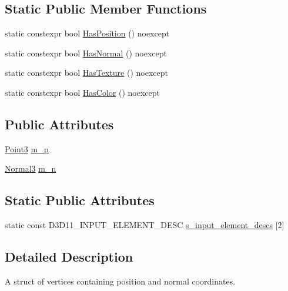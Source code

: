 \subsection*{Static Public Member Functions}
\begin{DoxyCompactItemize}
\item 
static constexpr bool \hyperlink{structmage_1_1rendering_1_1_vertex_position_normal_a90efd74233b76b071a322d737caf3abf}{Has\+Position} () noexcept
\item 
static constexpr bool \hyperlink{structmage_1_1rendering_1_1_vertex_position_normal_af5a32a3e51ce13c36b665f83f40209b6}{Has\+Normal} () noexcept
\item 
static constexpr bool \hyperlink{structmage_1_1rendering_1_1_vertex_position_normal_a40b091a64d0b5b2c2a07b382cd546589}{Has\+Texture} () noexcept
\item 
static constexpr bool \hyperlink{structmage_1_1rendering_1_1_vertex_position_normal_aead42377c86418475bb7b4c93398cd34}{Has\+Color} () noexcept
\end{DoxyCompactItemize}
\subsection*{Public Attributes}
\begin{DoxyCompactItemize}
\item 
\hyperlink{structmage_1_1_point3}{Point3} \hyperlink{structmage_1_1rendering_1_1_vertex_position_normal_a14824f61c8740e3472fccff1e3678515}{m\+\_\+p}
\item 
\hyperlink{structmage_1_1_normal3}{Normal3} \hyperlink{structmage_1_1rendering_1_1_vertex_position_normal_a5955e74eca6ef6c7516e6664370f8598}{m\+\_\+n}
\end{DoxyCompactItemize}
\subsection*{Static Public Attributes}
\begin{DoxyCompactItemize}
\item 
static const D3\+D11\+\_\+\+I\+N\+P\+U\+T\+\_\+\+E\+L\+E\+M\+E\+N\+T\+\_\+\+D\+E\+SC \hyperlink{structmage_1_1rendering_1_1_vertex_position_normal_aa8d64953c3186e90eef7a5120c601788}{s\+\_\+input\+\_\+element\+\_\+descs} \mbox{[}2\mbox{]}
\end{DoxyCompactItemize}


\subsection{Detailed Description}
A struct of vertices containing position and normal coordinates. 

